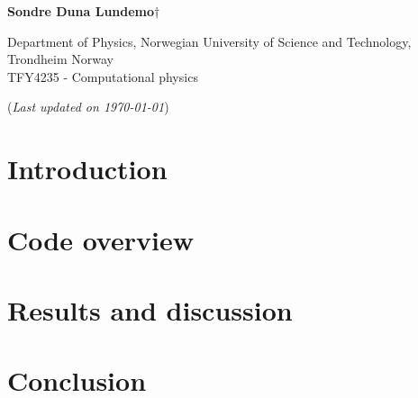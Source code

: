 


	
\begin{titlepage}
	\begin{center}
	\setlength{\parskip}{0em}
	\thispagestyle{titlepage}
	

	\vspace{4mm}
	
	\large{\textbf{Sondre Duna Lundemo}}$\dagger$
	
	\normalsize{Department of Physics, Norwegian University of Science and Technology, Trondheim Norway \\
	TFY4235 - Computational physics
	}

	(\textit{Last updated on \today})
	\end{center}

	\setlength{\parindent}{2em}
	
	\begin{figure}
		
	\end{figure}
	

\end{titlepage}

\newpage
\setlength{\parskip}{0em}
\tableofcontents
\setlength{\parskip}{1em}
\newpage

\part{Introduction}


\newpage

\part{Code overview}


\newpage

\part{Results and discussion}



\newpage
\part{Conclusion}





